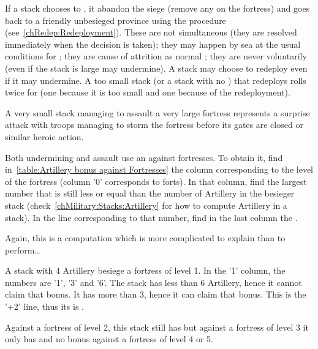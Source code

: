 If a stack chooses to , it abandon the siege (remove any
\USURE on the fortress) and goes back to a friendly unbesieged province using
the  procedure (see~\ref{chRedep:Redeployment}). These
 are not simultaneous (they are resolved immediately when
the decision is taken); they may happen by sea at the usual conditions for
; they are cause of attrition as normal
; they are never voluntarily (even if the stack is large
may undermine). A stack may choose to redeploy even if it may undermine. A too
small stack (or a stack with no \LoS) that redeploys rolls twice for
 (one  because it is too small and one
 because of the redeployment).

\begin{designnote}
  A very small stack managing to assault a very large fortress represents a
  surprise attack with troops managing to storm the fortress before its gates
  are closed or similar heroic action.
\end{designnote}


Both undermining and assault use an  against
fortresses. To obtain it, find in~\ref{table:Artillery bonus against
  Fortresses} the column corresponding to the level of the fortress (column
'0' corresponds to forts). In that column, find the largest number that is
still less or equal than the number of Artillery in the besieger stack
(check~\ref{chMilitary:Stacks:Artillery} for how to compute Artillery in a
stack). In the line corresponding to that number, find in the last column the
.

\begin{exemple}
  Again, this is a computation which is more complicated to explain than to
  perform\ldots

  A stack with 4 Artillery besiege a fortress of level 1. In the '1' column,
  the numbers are '1', '3' and '6'. The stack has less than 6 Artillery, hence
  it cannot claim that bonus. It has more than 3, hence it can claim that
  bonus. This is the '+2' line, thus its  is
  .

  Against a fortress of level 2, this stack still has  but against a
  fortress of level 3 it only has  and no bonus against a fortress
  of level 4 or 5.
\end{exemple}


